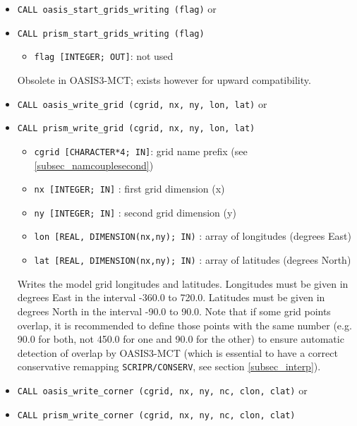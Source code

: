 \begin{itemize}

\item {\tt CALL  oasis\_start\_grids\_writing (flag)} or
\item {\tt CALL  prism\_start\_grids\_writing (flag)}
\begin{itemize}
    \item {\tt flag [INTEGER; OUT]}:  not used
  \end{itemize}
  Obsolete in OASIS3-MCT; exists however for upward compatibility.

\vspace{0.2cm}
\item {\tt CALL oasis\_write\_grid (cgrid, nx, ny, lon, lat)} or
\item {\tt CALL prism\_write\_grid (cgrid, nx, ny, lon, lat)}
        
 \begin{itemize}
    \item {\tt cgrid [CHARACTER*4; IN]}: grid name prefix (see
    \ref{subsec_namcouplesecond})
    \item {\tt nx [INTEGER; IN]} : first grid dimension (x)
    \item {\tt ny [INTEGER; IN]} : second grid dimension (y)
    \item {\tt lon [REAL, DIMENSION(nx,ny); IN)} : array of longitudes
      (degrees East) 
    \item {\tt lat [REAL, DIMENSION(nx,ny); IN)} : array of latitudes
    (degrees North)
 \end{itemize}

 Writes the model grid longitudes and latitudes. Longitudes must
 be given in degrees East in the interval -360.0 to 720.0. Latitudes
 must be given in degrees North in the interval -90.0 to 90.0. Note
 that if some grid points overlap, it is recommended to define those
 points with the same number (e.g. 90.0 for both, not 450.0 for one
 and 90.0 for the other) to ensure automatic detection of overlap by OASIS3-MCT
 (which is essential to have a correct conservative remapping
 \texttt{SCRIPR/CONSERV}, see section \ref{subsec_interp}). 

\vspace{0.2cm}
\item {\tt CALL oasis\_write\_corner (cgrid, nx, ny, nc, clon, clat)} or
\item {\tt CALL prism\_write\_corner (cgrid, nx, ny, nc, clon, clat)}


\end{itemize}
